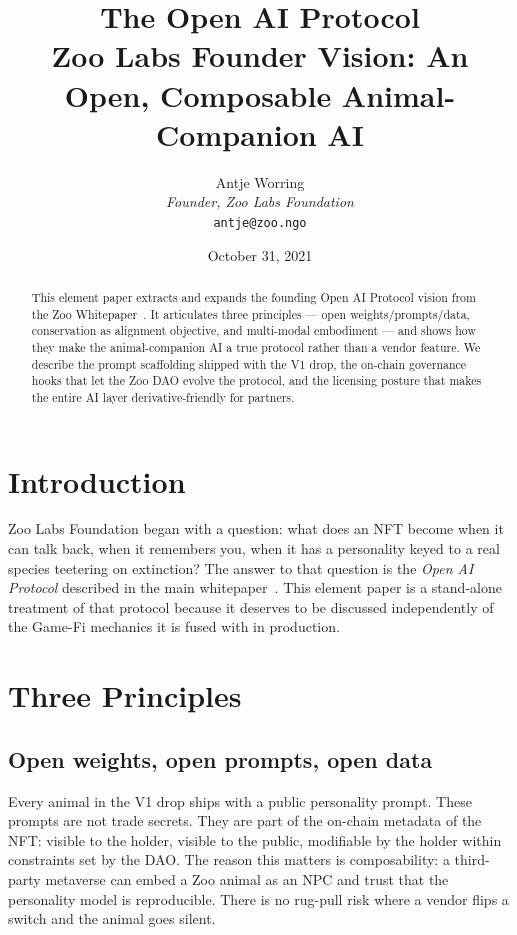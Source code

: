\documentclass[11pt,letterpaper]{article}
\title{\textbf{The Open AI Protocol}\\\large Zoo Labs Founder Vision: An Open, Composable Animal-Companion AI}
\author{Antje Worring \\ \textit{Founder, Zoo Labs Foundation} \\ \texttt{antje@zoo.ngo}}
\date{October 31, 2021}
\begin{document}
\maketitle

\begin{abstract}
This element paper extracts and expands the founding Open AI Protocol vision from the Zoo Whitepaper~\cite{zoo2021}. It articulates three principles --- open weights/prompts/data, conservation as alignment objective, and multi-modal embodiment --- and shows how they make the animal-companion AI a true protocol rather than a vendor feature. We describe the prompt scaffolding shipped with the V1 drop, the on-chain governance hooks that let the Zoo DAO evolve the protocol, and the licensing posture that makes the entire AI layer derivative-friendly for partners.
\end{abstract}

\section{Introduction}

Zoo Labs Foundation began with a question: what does an NFT become when it can talk back, when it remembers you, when it has a personality keyed to a real species teetering on extinction? The answer to that question is the \emph{Open AI Protocol} described in the main whitepaper~\cite{zoo2021}. This element paper is a stand-alone treatment of that protocol because it deserves to be discussed independently of the Game-Fi mechanics it is fused with in production.

\section{Three Principles}

\subsection{Open weights, open prompts, open data}

Every animal in the V1 drop ships with a public personality prompt. These prompts are not trade secrets. They are part of the on-chain metadata of the NFT: visible to the holder, visible to the public, modifiable by the holder within constraints set by the DAO. The reason this matters is composability: a third-party metaverse can embed a Zoo animal as an NPC and trust that the personality model is reproducible. There is no rug-pull risk where a vendor flips a switch and the animal goes silent.
\end{document}

